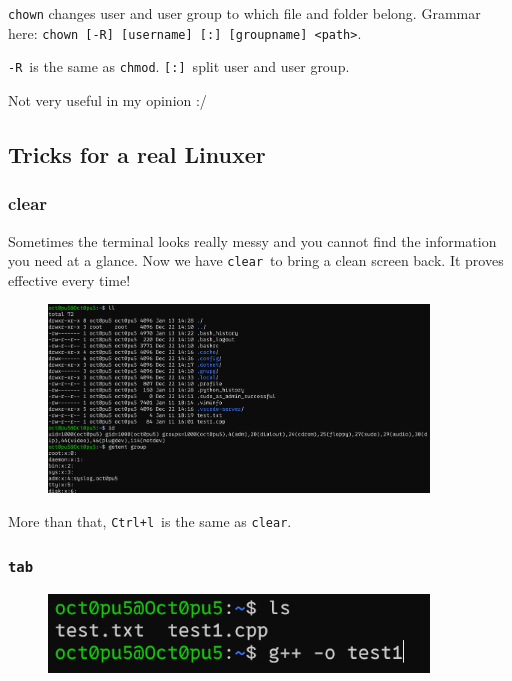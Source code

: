 \documentclass[12pt]{ctexart}
\newenvironment{mdquote}
{%
  \par\noindent
  \begin{list}{}{%
      \setlength{\leftmargin}{1em}%
      \setlength{\rightmargin}{0pt}%
      \setlength{\itemindent}{0pt}%
      \setlength{\listparindent}{\parindent}%
      \setlength{\topsep}{0.5\baselineskip}%
  }
  \item[\textbf{>}\ ]\itshape
}
{\end{list}\par}
\begin{document}
\texttt{chown} changes user and user group to which file and folder
belong. Grammar here:
\texttt{chown\ {[}-R{]}\ {[}username{]}\ {[}:{]}\ {[}groupname{]}\ \textless{}path\textgreater{}}.

\texttt{-R}\ is the same as \texttt{chmod}. \texttt{{[}:{]}}\ split user
and user group.

Not very useful in my opinion :/

\subsection{\textbf{Tricks for a real Linuxer}}

\subsubsection{clear}

Sometimes the terminal looks really messy and you cannot find the
information you need at a glance. Now we have \texttt{clear}\ to bring a
clean screen back. It proves effective every time!

\begin{figure}[H]
    \centering
    \includegraphics[width=0.9\textwidth,keepaspectratio]{assets/Linux/1.7 Tricks for a real Linuxer/1.png}
\end{figure}

\begin{mdquote}
More than that, \texttt{Ctrl+l}\ is the same as \texttt{clear}.
\end{mdquote}

\subsubsection{\texttt{tab}}

\begin{figure}[H]
    \centering
    \includegraphics[width=0.9\textwidth,keepaspectratio]{assets/Linux/1.7 Tricks for a real Linuxer/2.png}
\end{figure}
\end{document}
